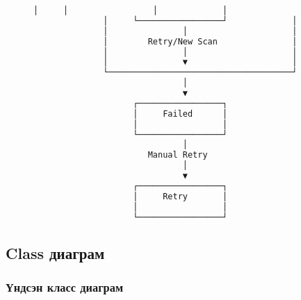 \documentclass[main.tex]{subfiles}
\begin{document}
\begin{figure}[h]
\begin{lstlisting}[language=bash, caption=Scan State диаграм]
              │     │                 │             │
              │     └─────────────────┘             │
              │               │                     │
              │        Retry/New Scan               │
              │               │                     │
              │               ▼                     │
              └─────────────────────────────────────┘
                              │
                              ▼
                    ┌─────────────────┐
                    │     Failed      │
                    │                 │
                    └─────────────────┘
                              │
                       Manual Retry
                              │
                              ▼
                    ┌─────────────────┐
                    │     Retry       │
                    │                 │
                    └─────────────────┘
\end{lstlisting}
\end{figure}

\subsection{Class диаграм}

\subsubsection{Үндсэн класс диаграм}
\end{document}
